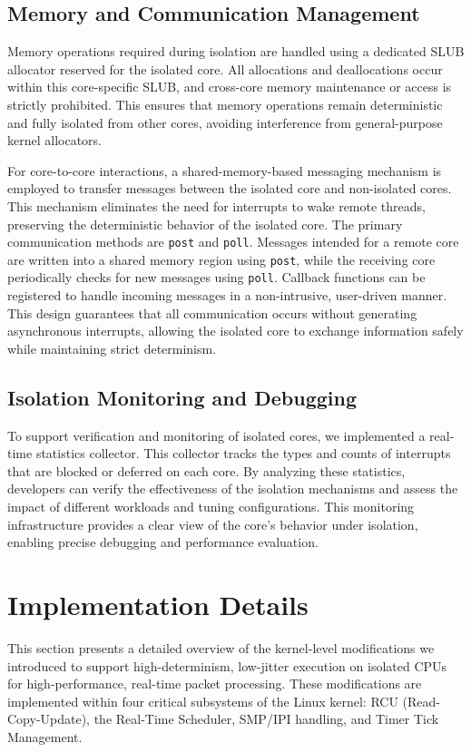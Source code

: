 \documentclass[letterpaper]{article}
\begin{document}
\subsection{Memory and Communication Management}
\label{subsec:memory-communication}

Memory operations required during isolation are handled using a dedicated SLUB allocator reserved for the isolated core. All allocations and deallocations occur within this core-specific SLUB, and cross-core memory maintenance or access is strictly prohibited. This ensures that memory operations remain deterministic and fully isolated from other cores, avoiding interference from general-purpose kernel allocators.

For core-to-core interactions, a shared-memory-based messaging mechanism is employed to transfer messages between the isolated core and non-isolated cores. This mechanism eliminates the need for interrupts to wake remote threads, preserving the deterministic behavior of the isolated core. The primary communication methods are \texttt{post} and \texttt{poll}. Messages intended for a remote core are written into a shared memory region using \texttt{post}, while the receiving core periodically checks for new messages using \texttt{poll}. Callback functions can be registered to handle incoming messages in a non-intrusive, user-driven manner. This design guarantees that all communication occurs without generating asynchronous interrupts, allowing the isolated core to exchange information safely while maintaining strict determinism.

\subsection{Isolation Monitoring and Debugging}
\label{subsec:isolation-monitoring}

To support verification and monitoring of isolated cores, we implemented a real-time statistics collector. This collector tracks the types and counts of interrupts that are blocked or deferred on each core. By analyzing these statistics, developers can verify the effectiveness of the isolation mechanisms and assess the impact of different workloads and tuning configurations. This monitoring infrastructure provides a clear view of the core’s behavior under isolation, enabling precise debugging and performance evaluation.

\section{Implementation Details}
This section presents a detailed overview of the kernel-level modifications we introduced to
support high-determinism, low-jitter execution on isolated CPUs for high-performance, real-time
packet processing. These modifications are implemented within four critical subsystems of the
Linux kernel: RCU (Read-Copy-Update), the Real-Time Scheduler, SMP/IPI handling, and Timer Tick
Management. 
\end{document}
